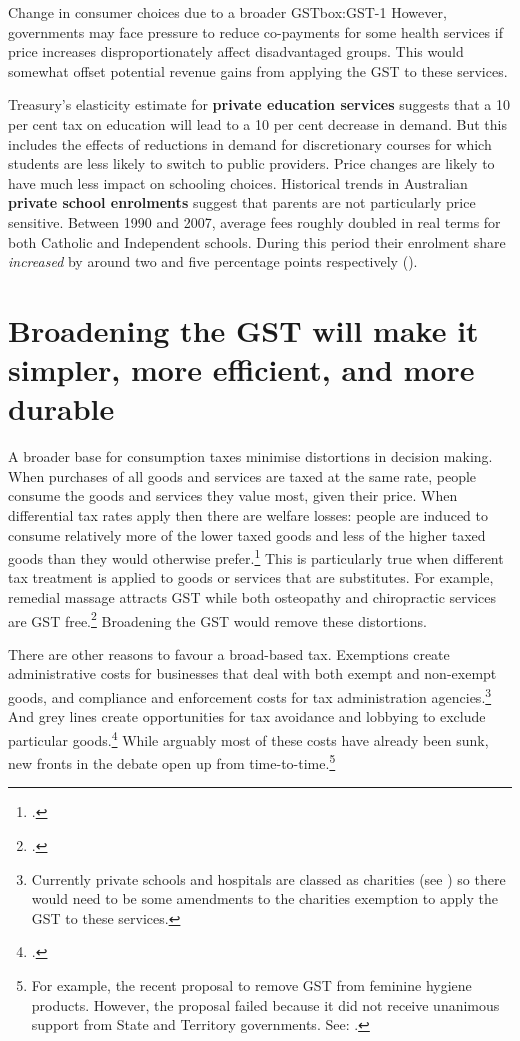 \begin{bigboxC*}{Change in consumer choices due to a broader GST}{box:GST-1}
However, governments may face pressure to reduce co-payments for some health services if price increases disproportionately affect disadvantaged groups. This would somewhat offset potential revenue gains from applying the GST to these services. 

Treasury’s elasticity estimate for \textbf{private education services} suggests that a 10 per cent tax on education will lead to a 10 per cent decrease in demand. But this includes the effects of reductions in demand for discretionary courses for which students are less likely to switch to public providers. Price changes are likely to have much less impact on schooling choices. Historical trends in Australian \textbf{private school enrolments} suggest that parents are not particularly price sensitive. Between 1990 and 2007, average fees roughly doubled in real terms for both Catholic and Independent schools. During this period their enrolment share \emph{increased} by around two and five percentage points respectively (\textcite{NousGroup2011-Funding-for-Schooling}). 


\end{bigboxC*}


\section{Broadening the GST will make it simpler, more efficient, and more durable}\label{sec:GST-2-3}
A broader base for consumption taxes minimise distortions in decision making. When purchases of all goods and services are taxed at the same rate, people consume the goods and services they value most, given their price. When differential tax rates apply then there are welfare losses: people are induced to consume relatively more of the lower taxed goods and less of the higher taxed goods than they would otherwise prefer.\footcite{AtkinsonStiglitz1976}  This is particularly true when different tax treatment is applied to goods or services that are substitutes. For example, remedial massage attracts GST while both osteopathy and chiropractic services are GST free.\footcite[][\S38-7]{GST-Act-1999}  Broadening the GST would remove these distortions.  

There are other reasons to favour a broad-based tax. Exemptions create administrative costs for businesses that deal with both exempt and non-exempt goods, and compliance and enforcement costs for tax administration agencies.\footnote{Currently private schools and hospitals are classed as charities (see \textcite{ACNC2015}) so there would need to be some amendments to the charities exemption to apply the GST to these services.}  And grey lines create opportunities for tax avoidance and lobbying to exclude particular goods.\footcite{Freebairn2015}  While arguably most of these costs have already been sunk, new fronts in the debate open up from time-to-time.\footnote{For example, the recent proposal to remove GST from feminine hygiene products. However, the proposal failed because it did not receive unanimous support from State and Territory governments. See: \textcite{Hockey2015-Federal-Finance-Relations}.}  

